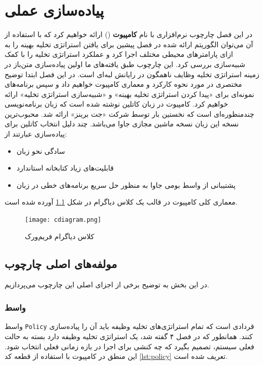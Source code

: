 \chapter{پیاده‌سازی عملی}
در این فصل چارچوب نرم‌افزاری با نام \textbf{کامپیوت} () ارائه خواهیم کرد که با استفاده از آن می‌توان الگوریتم ارائه شده در فصل پیشین برای یافتن استراتژی تخلیه بهینه را به ازای پارامترهای محیطی مختلف اجرا کرد و عملکرد استراتژی تخلیه را با کمک شبیه‌سازی بررسی کرد. این چارچوب طبق یافته‌های ما اولین پیاده‌سازی متن‌باز در زمینه استراتژی تخلیه وظایف ناهمگون در رایانش لبه‌ای است. در این فصل ابتدا توضیح مختصری در مورد نحوه کارکرد و معماری کامپیوت خواهیم داد و سپس برنامه‌های نمونه‌ای برای «پیدا کردن استراتژی تخلیه بهینه» و «شبیه‌سازی استراتژی تخلیه» ارائه خواهیم کرد. کامپیوت در زبان کاتلین نوشته شده است که زبان برنامه‌نویسی چندمنظوره‌ای است که نخستین بار توسط شرکت «جت برینز» ارائه شد. محبوب‌ترین نسخه این زبان نسخه ماشین مجازی جاوا می‌باشد. چند دلیل انتخاب کاتلین برای پیاده‌سازی \CurrentProject عبارتند از:
\begin{itemize}
	\item سادگی نحو زبان
	\item قابلیت‌های زیاد کتابخانه استاندارد
	\item پشتیبانی از واسط بومی جاوا به منظور حل سریع برنامه‌های خطی در زبان 
\end{itemize}
معماری کلی کامپیوت در قالب یک کلاس دیاگرام در شکل \ref{fig:classdiagram} آورده شده است. 
\begin{figure}[H]
	\centering
	\texttt{[image: cdiagram.png]}
	\caption{کلاس دیاگرام فریم‌ورک }
	\label{fig:classdiagram}
\end{figure}
\section{مولفه‌های اصلی چارچوب }
در این بخش به توضیح برخی از اجزای اصلی این چارچوب می‌پردازیم.
\subsection{واسط }
واسط \texttt{\footnotesize Policy} قردادی است که تمام استراتژی‌های تخلیه وظیفه باید آن را پیاده‌سازی کنند. همانطور که در فصل ۴ گفته شد، یک استراتژی تخلیه وظیفه دارد بسته به حالت فعلی سیستم، تصمیم بگیرد که چه کنشی برای اجرا در بازه زمانی فعلی انتخاب شود. این منطق در کامپیوت با استفاده از قطعه کد \ref{lst:policy} تعریف شده است.


